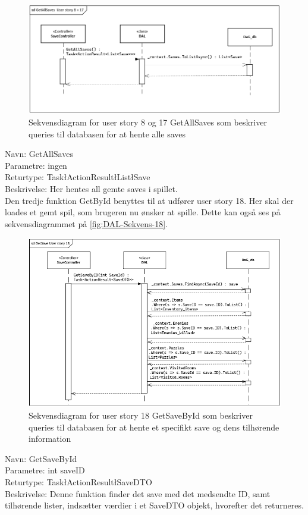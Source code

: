 \begin{figure}[H]
\centering
\includegraphics[width = \textwidth]{02-Body/Images/DAL-Database/GetSavesSd.PNG}
\caption{Sekvensdiagram for user story 8 og 17 GetAllSaves som beskriver queries til databasen for at hente alle saves}
\label{fig:DAL-Sekvens-17}
\end{figure}

Navn: GetAllSaves\\
Parametre: ingen\\
Returtype: Task\l ActionResult\l List\l Save\g\g\g \\
Beskrivelse: Her hentes all gemte saves i spillet.\\

Den tredje funktion GetById benyttes til at udfører user story 18.
Her skal der loades et gemt spil, som brugeren nu ønsker at spille. 
Dette kan også ses på sekvensdiagrammet på \autoref{fig:DAL-Sekvens-18}.\\

\begin{figure}[H]
\centering
\includegraphics[width = \textwidth]{02-Body/Images/DAL-Database/GetSavesByIdSd.PNG}
\caption{Sekvensdiagram for user story 18 GetSaveById som beskriver queries til databasen for at hente et specifikt save og dens tilhørende information}
\label{fig:DAL-Sekvens-18}
\end{figure}

Navn: GetSaveById \\
Parametre: int saveID\\
Returtype: Task\l ActionResult\l SaveDTO\g\g\\
Beskrivelse: Denne funktion finder det save med det medsendte ID, samt tilhørende lister, indsætter værdier i et SaveDTO objekt, hvorefter det returneres.\\